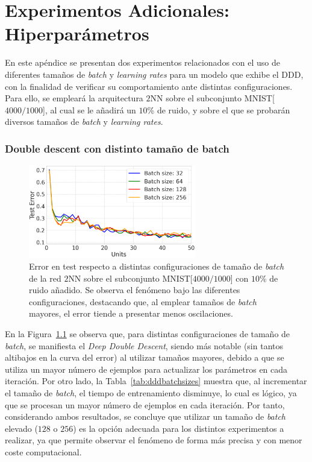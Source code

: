 
\chapter{Experimentos Adicionales: Hiperparámetros}\label{ap:apendiceB}

En este apéndice se presentan dos experimentos relacionados con el uso de diferentes tamaños de \textit{batch} y \textit{learning rates} para un modelo que exhibe el DDD, con la finalidad de verificar su comportamiento ante distintas configuraciones. Para ello, se empleará la arquitectura $2$NN sobre el subconjunto MNIST[$4000/1000$], al cual se le añadirá un $10$\% de ruido, y sobre el que se probarán diversos tamaños de \textit{batch} y \textit{learning rates}.
 
\subsection*{Double descent con distinto tamaño de batch}

\begin{figure}[h!]
    \centering
    \includegraphics[width=0.65\textwidth]{img/experiments/batch_sizes_ddd.png}
    \caption[\textit{Deep Double Descent} para distintos tamaños de \textit{batch}.]{Error en test respecto a distintas configuraciones de tamaño de \textit{batch} de la red $2$NN sobre el subconjunto MNIST[$4000/1000$] con $10$\% de ruido añadido. Se observa el fenómeno bajo las diferentes configuraciones, destacando que, al emplear tamaños de \textit{batch} mayores, el error tiende a presentar menos oscilaciones.}\label{fig:dddbatchsizes}
\end{figure}

En la Figura~\ref{fig:dddbatchsizes} se observa que, para distintas configuraciones de tamaño de \textit{batch}, se manifiesta el \textit{Deep Double Descent}, siendo más notable (sin tantos altibajos en la curva del error) al utilizar tamaños mayores, debido a que se utiliza un mayor número de ejemplos para actualizar los parámetros en cada iteración. Por otro lado, la Tabla~\ref{tab:dddbatchsizes} muestra que, al incrementar el tamaño de \textit{batch}, el tiempo de entrenamiento disminuye, lo cual es lógico, ya que se procesan un mayor número de ejemplos en cada iteración. Por tanto, considerando ambos resultados, se concluye que utilizar un tamaño de \textit{batch} elevado ($128$ o $256$) es la opción adecuada para los distintos experimentos a realizar, ya que permite observar el fenómeno de forma más precisa y con menor coste computacional.

